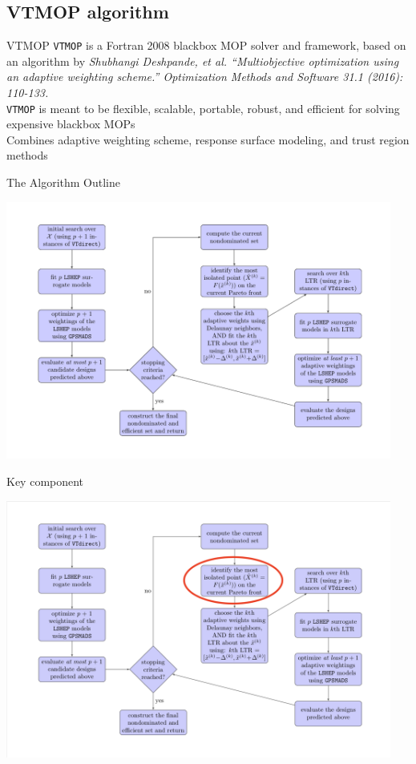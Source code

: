 \documentclass[xcolor=dvipsnames]{beamer}
\begin{document}
\subsection{VTMOP algorithm}
\begin{frame}{VTMOP}
\texttt{VTMOP} is a Fortran 2008 blackbox MOP solver and framework,
based on an algorithm by
{ \small \it Shubhangi Deshpande, et al.
``Multiobjective optimization using an adaptive weighting scheme.''
Optimization Methods and Software 31.1 (2016): 110-133.}\\
\medskip
{\tt VTMOP} is meant to be flexible, scalable, portable, robust, and
efficient for solving expensive blackbox MOPs\\
\medskip
Combines adaptive weighting scheme, response surface modeling, and trust
region methods
\end{frame}
\begin{frame}{The Algorithm Outline}
\begin{center}
\includegraphics[width=0.95\textwidth]{algorithm-chart.pdf}
\end{center}
\end{frame}
\begin{frame}{Key component}
\begin{center}
\includegraphics[width=0.95\textwidth]{isolated-chart.png}
\end{center}
\end{frame}
\end{document}

